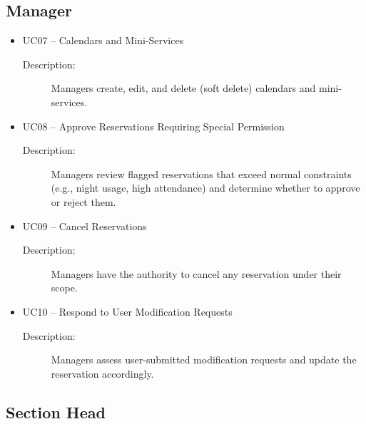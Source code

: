 \subsection{Manager}

\begin{itemize}
\item UC07 -- Calendars and Mini-Services

\begin{description}
\item [Description:] Managers create, edit, and delete (soft delete) calendars and mini-services.
\end{description}

\item UC08 -- Approve Reservations Requiring Special Permission

\begin{description}
\item [Description:] Managers review flagged reservations that exceed normal constraints (e.g., night usage, high attendance) and determine whether to approve or reject them.
\end{description}

\item UC09 -- Cancel Reservations

\begin{description}
\item [Description:] Managers have the authority to cancel any reservation under their scope.
\end{description}

\item UC10 -- Respond to User Modification Requests

\begin{description}
\item [Description:] Managers assess user-submitted modification requests and update the reservation accordingly.
\end{description}
\end{itemize}

\subsection{Section Head}

